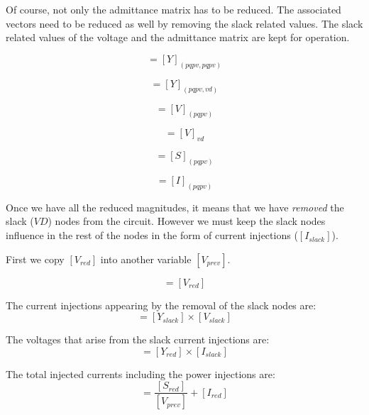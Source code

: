 \documentclass[nols,a4paper,twoside,notoc,fleqn]{tufte-book}
\begin{document}
Of course, not only the admittance matrix has to be reduced. The associated vectors need to be reduced as well by removing the slack related values. The slack related values of the voltage and the admittance matrix are kept for operation. 

\begin{equation}
[Y_{red}] = [Y]_{(pqpv, pqpv)}
\end{equation}

\begin{equation}
[Y_{slack}] = [Y]_{(pqpv, vd)}
\end{equation}

\begin{equation}
[V_{red}] = [V]_{(pqpv)}
\end{equation}

\begin{equation}
[V_{slack}] = [V]_{vd}
\end{equation}

\begin{equation}
[S_{red}] = [S]_{(pqpv)}
\end{equation}

\begin{equation}
[I_{red}] = [I]_{(pqpv)}
\end{equation}

Once we have all the reduced magnitudes, it means that we have \textit{removed} the slack ($VD$) nodes from the circuit. However we must keep the slack nodes influence in the rest of the nodes in the form of current injections ($[I_{slack}]$).

First we copy $[V_{red}]$ into another variable $[V_{prev}]$.

\begin{equation}
[V_{prev}] = [V_{red}]
\end{equation}

The current injections appearing by the removal of the slack nodes are:
\begin{equation}
[I_{slack}] = [Y_{slack}] \times [V_{slack}]
\end{equation}

The voltages that arise from the slack current injections are:
\begin{equation}
[C_k] = [Y_{red}] \times [I_{slack}]
\end{equation}

The total injected currents including the power injections are:
\begin{equation}
[I_k] = \frac{[S_{red}]}{[V_{prev}]} + [I_{red}]
\label{eq:zm_ik}
\end{equation}
\end{document}
